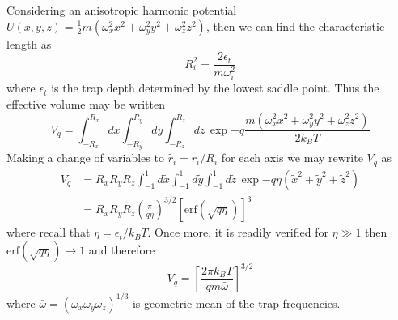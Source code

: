 Considering an anisotropic harmonic potential $U(x,y,z) = \frac{1}{2}m(\omega_x^2 x^2 + \omega_y^2 y^2 + \omega_z^2 z^2)$, then we can find the characteristic length as
\begin{equation}
	R_i^2 = \frac{2 \epsilon_t}{m \omega_i^2}
\end{equation}
where $\epsilon_t$ is the trap depth determined by the lowest saddle point.
Thus the effective volume may be written
\begin{equation}
	V_q = \int_{-R_x}^{R_x} dx \int_{-R_y}^{R_y} dy \int_{-R_z}^{R_z} dz  \,\exp{-q \frac{m(\omega_x^2 x^2 + \omega_y^2 y^2 + \omega_z^2 z^2)}{2 k_B T}}
\end{equation}
Making a change of variables to $\tilde{r_i} = r_i/R_i$ for each axis we may rewrite $V_q$ as
\begin{align}
	V_q &= R_x R_y R_z \int_{-1}^{1} d\tilde{x} \int_{-1}^{1} d\tilde{y} \int_{-1}^{1} d\tilde{z}  \,\exp{-q \eta(\tilde{x}^2 + \tilde{y}^2 + \tilde{z}^2)} \\
	&= R_x R_y R_z \left( \frac{\pi}{q \eta} \right)^{3/2} [\text{erf}(\sqrt{q \eta})]^3
\end{align}
where recall that $\eta = \epsilon_t/k_B T$.
Once more, it is readily verified for $\eta \gg 1$ then $\text{erf}(\sqrt{q \eta})\rightarrow1$ and therefore
\begin{equation}
	V_q = \left[ \frac{2 \pi k_B T}{q m \bar{\omega}} \right]^{3/2}
\end{equation}
where $\bar{\omega} = (\omega_x \omega_y \omega_z)^{1/3}$ is geometric mean of the trap frequencies. 